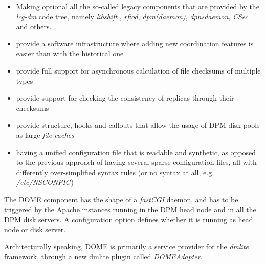 \documentclass[a4paper]{jpconf}
\begin{document}
\begin{itemize}
 \item Making optional all the so-called legacy components that are provided by the \textit{lcg-dm} code tree, namely \textit{libshift} \cite{libshift}, \textit{rfiod},
 \textit{dpm(daemon)}, \textit{dpnsdaemon}, \textit{CSec} and others.
 \item provide a software infrastructure where adding new coordination features is easier than with the historical one
 \item provide full support for asynchronous calculation of file checksums of multiple types
 \item provide support for checking the consistency of replicas through their checksums
 \item provide structure, hooks and callouts that allow the usage of DPM disk pools as large \textit{file caches}
 \item having a unified configuration file that is readable and synthetic, as opposed to the previous approach of having several
 sparse configuration files, all with differently over-simplified syntax rules (or no syntax at all, e.g. \textit{/etc/NSCONFIG})
\end{itemize}

The DOME component has the shape of a \textit{fastCGI} daemon, and has to be triggered by the Apache instances running in the DPM head node and
in all the DPM disk servers. A configuration option defines whether it is running as head node or disk server.

Architecturally speaking, DOME is primarily a service provider for the \textit{dmlite} framework, through a new dmlite plugin called \textit{DOMEAdapter}.\\
\end{document}
